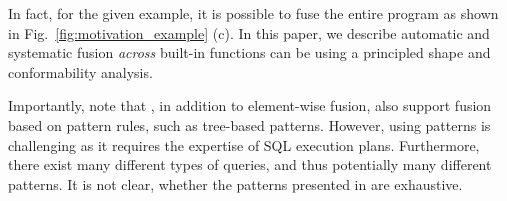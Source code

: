 In fact, for the given example, it is possible to fuse the entire program
as shown in Fig.~\ref{fig:motivation_example} (c).
In this paper, we describe automatic and systematic fusion \textit{across}
built-in functions can be using a principled shape and
conformability analysis. 

Importantly, note that \OldPaperAuthor, in addition to element-wise
fusion, also support fusion based on pattern rules, such as tree-based patterns.
However, using patterns is challenging as it requires the expertise of
SQL execution plans. Furthermore, there exist many different types of queries,
and thus potentially many different patterns. It is not clear, whether the
patterns presented in \OldPaper are exhaustive. 


